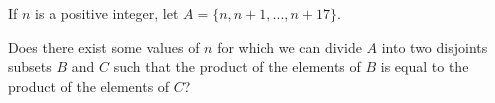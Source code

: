 If $n$ is a positive integer, let $A = \{n,n+1,...,n+17 \}$.

Does there exist some values of $n$ for which we can divide $A$ into two disjoints subsets $B$ and $C$ such that the product of the elements of $B$ is equal to the product of the elements of $C$?